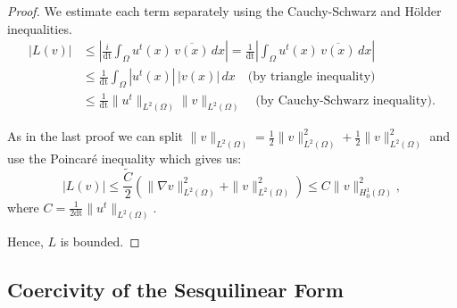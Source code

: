 \documentclass{article}
\theoremstyle{definition}
\theoremstyle{plain}
\newtheorem{lemma}[definition]{Lemma}
\theoremstyle{remark}
\newcommand{\dt}{\text{dt}}
\begin{document}

\begin{proof}
We estimate each term separately using the Cauchy-Schwarz and Hölder inequalities.
\begin{align*}
|L(v)| &\leq \left| \frac{i}{\dt} \int_\Omega u^{t}(x) \, \overline{v(x)} \, dx\right|= \frac{1}{\dt}\left| \int_\Omega u^{t}(x) \, \overline{v(x)} \, dx \right|\\
&\leq \frac{1}{\dt}\int_\Omega |u^{t}(x)| \, |v(x)| \, dx  \quad \text{(by triangle inequality)} \\
&\leq \frac{1}{\dt}\|u^{t}\|_{L^2(\Omega)} \|v\|_{L^2(\Omega)} \quad \text{(by Cauchy-Schwarz inequality)}.
\end{align*}


As in the last proof we can split $\|v\|_{L^2(\Omega)} = \frac{1}{2} \|v\|_{L^2(\Omega)}^2 + \frac{1}{2} \|v\|_{L^2(\Omega)}^2$ and use the Poincaré inequality which gives us:
\[
|L(v)| \leq \frac{\tilde{C}}{2} \left(\|\nabla v\|_{L^2(\Omega)}^2 + \|v\|_{L^2(\Omega)}^2 \right) \leq C \|v\|_{H_0^1(\Omega)}^2,
\]
where \( C = \frac{1}{2\dt}\|u^{t}\|_{L^2(\Omega)} \).

Hence, \( L \) is bounded.
\end{proof}

\subsection*{Coercivity of the Sesquilinear Form}
\end{document}
